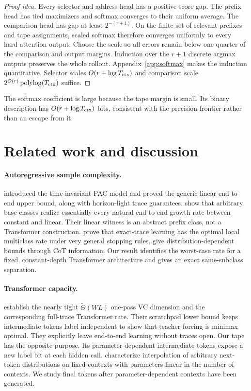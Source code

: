 \documentclass{article}
\newcommand{\1}{\mathbf 1}
\begin{document}
\begin{proof}[Proof idea]
Every selector and address head has a positive score gap. The prefix head has tied maximizers and
softmax converges to their uniform average. The comparison head has gap at least $2^{-(r+1)}$.
On the finite set of relevant prefixes and tape assignments, scaled softmax therefore converges
uniformly to every hard-attention output. Choose the scale so all errors remain below one quarter
of the comparison and output margins. Induction over the $r+1$ discrete argmax outputs preserves
the whole rollout. Appendix~\ref{app:softmax} makes the induction quantitative. Selector scales
$O(r+\log T_{\rm ctx})$ and comparison scale $2^{O(r)}\operatorname{polylog}(T_{\rm ctx})$
suffice.
\end{proof}

The softmax coefficient is large because the tape margin is small. Its binary description has
$O(r+\log T_{\rm ctx})$ bits, consistent with the precision frontier rather than an escape from it.

\section{Related work and discussion}

\paragraph{Autoregressive sample complexity.}
\citet{joshi2025theory} introduced the time-invariant PAC model and proved the generic linear
end-to-end upper bound, along with horizon-light trace guarantees. \citet{hanneke2026sample}
show that arbitrary base classes realize essentially every natural end-to-end growth rate between
constant and linear. Their linear witness is an abstract prefix class, not a Transformer
construction. \citet{li2026optimal} prove that exact-trace learning has the optimal local multiclass
rate under very general stopping rules. \citet{altabaa2025cot} give distribution-dependent bounds
through CoT information. Our result identifies the worst-case rate for a fixed, constant-depth
Transformer architecture and gives an exact same-subclass separation.

\paragraph{Transformer capacity.}
\citet{yang2026tight} establish the nearly tight $\widetilde\Theta(WL)$ one-pass VC dimension and
the corresponding full-trace Transformer rate. Their scratchpad lower bound keeps intermediate
tokens label independent to show that teacher forcing is minimax optimal. They explicitly leave
end-to-end learning without traces open. Our tape has the opposite purpose. Its parameter-dependent
intermediate tokens expose a new label bit at each hidden call. \citet{madden2025next} characterize
interpolation of arbitrary next-token distributions on fixed contexts with parameters linear in the
number of contexts. We study final tokens after parameter-dependent contexts have been generated.
\end{document}

